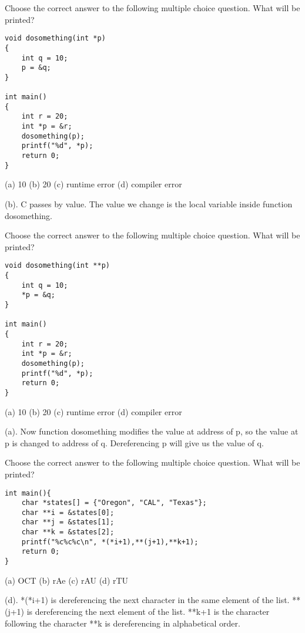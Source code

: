 \begin{blocksection}
\question
Choose the correct answer to the following multiple choice question. What will be printed?

\begin{verbatim}
void dosomething(int *p) 
{ 
    int q = 10; 
    p = &q; 
}     
    
int main() 
{ 
    int r = 20; 
    int *p = &r; 
    dosomething(p); 
    printf("%d", *p); 
    return 0; 
}
\end{verbatim}

(a) 10 (b) 20 (c) runtime error (d) compiler error

\begin{solution}
(b). C passes by value. The value we change is the local variable inside function dosomething.
\end{solution}

\question
Choose the correct answer to the following multiple choice question. What will be printed?

\begin{verbatim}
void dosomething(int **p) 
{ 
    int q = 10; 
    *p = &q; 
}     
    
int main() 
{ 
    int r = 20; 
    int *p = &r; 
    dosomething(p); 
    printf("%d", *p); 
    return 0; 
}
\end{verbatim}

(a) 10 (b) 20 (c) runtime error (d) compiler error

\begin{solution}
(a). Now function dosomething modifies the value at address of p, so the value at p is changed to address of q. Dereferencing p will give us the value of q.
\end{solution}

\question
Choose the correct answer to the following multiple choice question. What will be printed?

\begin{verbatim}
int main(){
    char *states[] = {"Oregon", "CAL", "Texas"};
    char **i = &states[0];
    char **j = &states[1];
    char **k = &states[2];
    printf("%c%c%c\n", *(*i+1),**(j+1),**k+1);
    return 0;
}
\end{verbatim}

(a) OCT (b) rAe (c) rAU (d) rTU

\begin{solution}
(d). *(*i+1) is dereferencing the next character in the same element of the list. **(j+1) is dereferencing the next element of the list. **k+1 is the character following the character **k is dereferencing in alphabetical order.
\end{solution}

\end{blocksection}